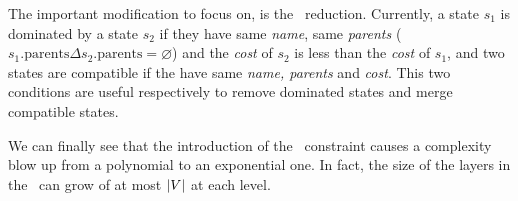The important modification to focus on, is the \mdd\ reduction. Currently, a state $s_1$ is dominated by a state $s_2$ if they have same \textit{name}, same \textit{parents} (\ie\ $s_1.\text{parents} \Delta s_2.\text{parents} = \varnothing$) and the \textit{cost} of $s_2$ is less than the \textit{cost} of $s_1$, and two states are compatible if the have same \textit{name, parents} and \textit{cost}. This two conditions are useful respectively to remove dominated states and merge compatible states.

We can finally see that the introduction of the \alldiff\ constraint causes a complexity blow up from a polynomial to an exponential one. In fact, the size of the layers in the \mdd\ can grow of at most $|V|$ at each level.


